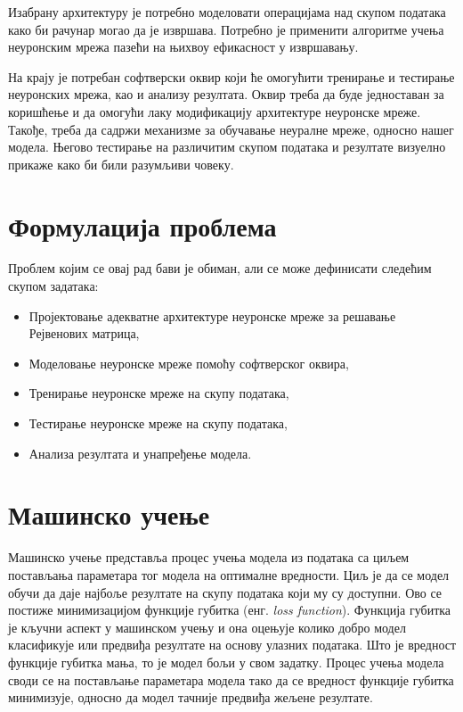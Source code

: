 \documentclass[a4paper, 12pt, master, utf8]{etf}
\begin{document}
Изабрану архитектуру је потребно моделовати операцијама над скупом података како би рачунар могао да је извршава. Потребно је применити алгоритме учења неуронским мрежа пазећи на њихвоу ефикасност у извршавању.
\newline

На крају је потребан софтверски оквир који ће омогућити тренирање и тестирање неуронских мрежа, као и анализу резултата. 
Оквир треба да буде једноставан за коришћење и да омогући лаку модификацију архитектуре неуронске 
мреже. Такође, треба да садржи механизме за обучавање неуралне мреже, односно нашег модела. Његово тестирање на различитим скупом података и 
резултате визуелно прикаже како би били разумљиви човеку.

\section{Формулација проблема}
\label{sec:21}
Проблем којим се овај рад бави је обиман, али се може дефинисати следећим скупом задатака:

\begin{itemize}[noitemsep]
    \item  Пројектовање адекватне архитектуре неуронске мреже за решавање Рејвенових матрица,
    \item  Моделовање неуронске мреже помоћу софтверског оквира,
    \item  Тренирање неуронске мреже на скупу података,
    \item  Тестирање неуронске мреже на скупу података,
    \item  Анализа резултата и унапређење модела.
\end{itemize}

\section{Машинско учење}
\label{sec:22}
Машинско учење представља процес учења модела из података са циљем постављања параметара тог модела 
на оптималне вредности. Циљ је да се модел обучи да даје најбоље резултате на скупу података који му 
су доступни. Ово се постиже минимизацијом функције губитка (енг. \textit{loss function}). 
Функција губитка је кључни аспект у машинском учењу и она оцењује колико добро модел класификује 
или предвиђа резултате на основу улазних података. Што је вредност функције губитка мања, то је модел бољи у свом задатку. 
Процес учења модела своди се на постављање параметара модела тако да се 
вредност функције губитка минимизује, односно да модел тачније предвиђа жељене резултате. 
\newline
\end{document}
